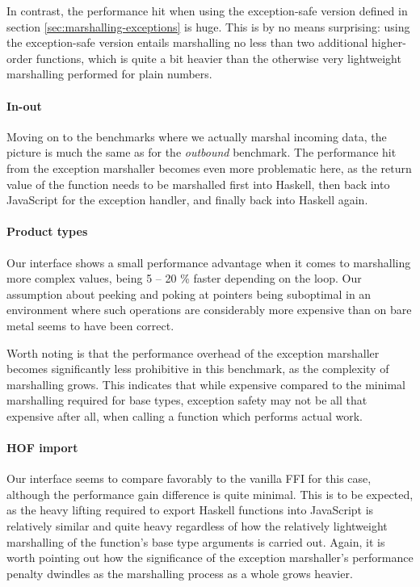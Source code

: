 \documentclass[preprint]{sigplanconf}
\begin{document}
In contrast, the performance hit when using the exception-safe version defined
in section \ref{sec:marshalling-exceptions} is huge.
This is by no means surprising: using the exception-safe version entails
marshalling no less than two additional higher-order functions, which is quite
a bit heavier than the otherwise very lightweight marshalling performed for
plain numbers.

\paragraph{In-out}
Moving on to the benchmarks where we actually marshal incoming data, the
picture is much the same as for the \emph{outbound} benchmark. The performance
hit from the exception marshaller becomes even more problematic here, as the
return value of the function needs to be marshalled first into Haskell,
then back into JavaScript for the exception handler, and finally back into
Haskell again.

\paragraph{Product types}
Our interface shows a small performance advantage when it comes to
marshalling more complex values, being 5 -- 20 \% faster
depending on the loop. Our assumption about peeking and poking at pointers
being suboptimal in an environment where such operations are considerably
more expensive than on bare metal seems to have been correct.

Worth noting is that the performance overhead of the exception marshaller
becomes significantly less prohibitive in this benchmark, as the complexity
of marshalling grows. This indicates that while expensive compared to
the minimal marshalling required for base types, exception safety may not be
all that expensive after all, when calling a function which performs actual
work.

\paragraph{HOF import}
Our interface seems to compare favorably to the vanilla FFI for this case,
although the performance gain difference is quite minimal. This is to be
expected, as the heavy lifting required to export Haskell functions into
JavaScript is relatively similar and quite heavy regardless of how the
relatively lightweight marshalling of the function's base type arguments
is carried out. Again, it is worth pointing out how the significance of the
exception marshaller's performance penalty dwindles as the marshalling
process as a whole grows heavier.
\end{document}
